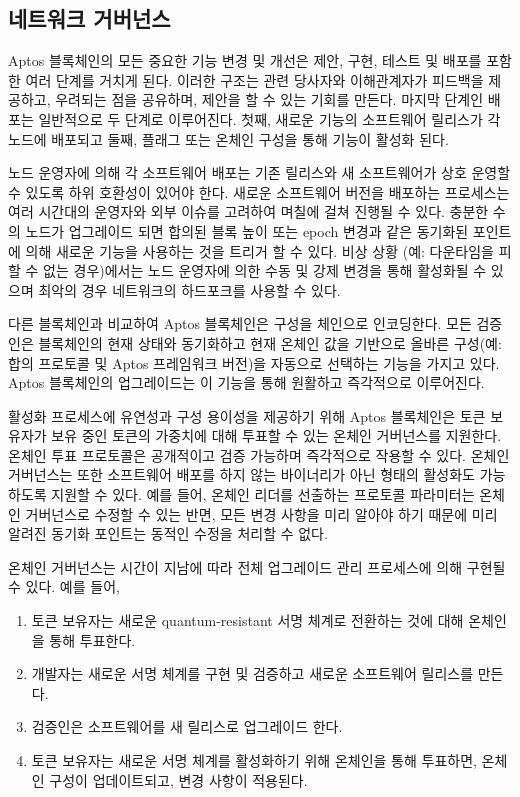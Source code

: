 \documentclass{article}
\begin{document}
\subsection{네트워크 거버넌스}
\label{subsec:network_governance}

Aptos 블록체인의 모든 중요한 기능 변경 및 개선은 제안, 구현, 테스트 및 배포를 포함한 여러 단계를 거치게 된다. 이러한 구조는 관련 당사자와 이해관계자가 피드백을 제공하고, 우려되는 점을 공유하며, 제안을 할 수 있는 기회를 만든다. 마지막 단계인 배포는 일반적으로 두 단계로 이루어진다. 첫째, 새로운 기능의 소프트웨어 릴리스가 각 노드에 배포되고 둘째, 플래그 또는 온체인 구성을 통해 기능이 활성화 된다.

노드 운영자에 의해 각 소프트웨어 배포는 기존 릴리스와 새 소프트웨어가 상호 운영할 수 있도록 하위 호환성이 있어야 한다. 새로운 소프트웨어 버전을 배포하는 프로세스는 여러 시간대의 운영자와 외부 이슈를 고려하여 며칠에 걸쳐 진행될 수 있다. 충분한 수의 노드가 업그레이드 되면 합의된 블록 높이 또는 epoch 변경과 같은 동기화된 포인트에 의해 새로운 기능을 사용하는 것을 트리거 할 수 있다. 비상 상황 (예: 다운타임을 피할 수 없는 경우)에서는 노드 운영자에 의한 수동 및 강제 변경을 통해 활성화될 수 있으며 최악의 경우 네트워크의 하드포크를 사용할 수 있다.

다른 블록체인과 비교하여 Aptos 블록체인은 구성을 체인으로 인코딩한다. 모든 검증인은 블록체인의 현재 상태와 동기화하고 현재 온체인 값을 기반으로 올바른 구성(예: 합의 프로토콜 및 Aptos 프레임워크 버전)을 자동으로 선택하는 기능을 가지고 있다. Aptos 블록체인의 업그레이드는 이 기능을 통해 원활하고 즉각적으로 이루어진다.

활성화 프로세스에 유연성과 구성 용이성을 제공하기 위해 Aptos 블록체인은 토큰 보유자가 보유 중인 토큰의 가중치에 대해 투표할 수 있는 온체인 거버넌스를 지원한다. 온체인 투표 프로토콜은 공개적이고 검증 가능하며 즉각적으로 작용할 수 있다. 온체인 거버넌스는 또한 소프트웨어 배포를 하지 않는 바이너리가 아닌 형태의 활성화도 가능하도록 지원할 수 있다. 예를 들어, 온체인 리더를 선출하는 프로토콜 파라미터는 온체인 거버넌스로 수정할 수 있는 반면, 모든 변경 사항을 미리 알아야 하기 때문에 미리 알려진 동기화 포인트는 동적인 수정을 처리할 수 없다.

온체인 거버넌스는 시간이 지남에 따라 전체 업그레이드 관리 프로세스에 의해 구현될 수 있다. 예를 들어,
\begin{enumerate}
\item 토큰 보유자는 새로운 quantum-resistant 서명 체계로 전환하는 것에 대해 온체인을 통해 투표한다.

\item 개발자는 새로운 서명 체계를 구현 및 검증하고 새로운 소프트웨어 릴리스를 만든다.

\item 검증인은 소프트웨어를 새 릴리스로 업그레이드 한다.

\item 토큰 보유자는 새로운 서명 체계를 활성화하기 위해 온체인을 통해 투표하면, 온체인 구성이 업데이트되고, 변경 사항이 적용된다.
\end{enumerate}
\end{document}
